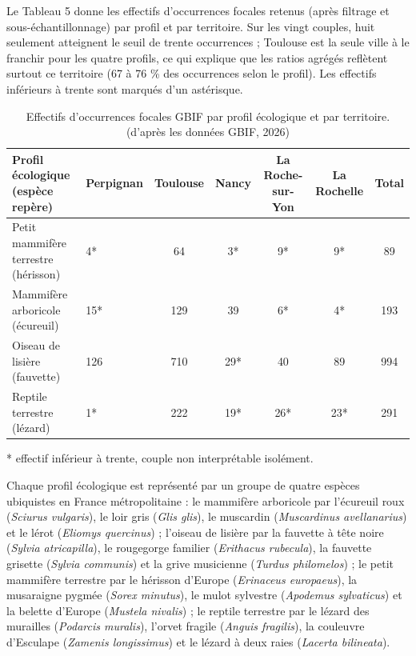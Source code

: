 \documentclass[a4paper,11pt]{report}
\begin{document}
Le Tableau 5 donne les effectifs d'occurrences focales retenus (après filtrage et sous-échantillonnage) par profil et par territoire. Sur les vingt couples, huit seulement atteignent le seuil de trente occurrences ; Toulouse est la seule ville à le franchir pour les quatre profils, ce qui explique que les ratios agrégés reflètent surtout ce territoire (67 à 76 \% des occurrences selon le profil). Les effectifs inférieurs à trente sont marqués d'un astérisque.

\begin{landscape}
\begin{table}[H]
\centering
\footnotesize
\caption{Effectifs d'occurrences focales GBIF par profil écologique et par territoire. (d'après les données GBIF, 2026)}
\begin{tabular}{llccccc}
\toprule
\textbf{Profil écologique (espèce repère)} & \textbf{Perpignan} & \textbf{Toulouse} & \textbf{Nancy} & \textbf{La Roche-sur-Yon} & \textbf{La Rochelle} & \textbf{Total} \\
\midrule
Petit mammifère terrestre (hérisson) & 4* & 64 & 3* & 9* & 9* & 89 \\
Mammifère arboricole (écureuil) & 15* & 129 & 39 & 6* & 4* & 193 \\
Oiseau de lisière (fauvette) & 126 & 710 & 29* & 40 & 89 & 994 \\
Reptile terrestre (lézard) & 1* & 222 & 19* & 26* & 23* & 291 \\
\bottomrule
\end{tabular}
\end{table}
\end{landscape}

* effectif inférieur à trente, couple non interprétable isolément.

Chaque profil écologique est représenté par un groupe de quatre espèces ubiquistes en France métropolitaine : le mammifère arboricole par l'écureuil roux (\textit{Sciurus vulgaris}), le loir gris (\textit{Glis glis}), le muscardin (\textit{Muscardinus avellanarius}) et le lérot (\textit{Eliomys quercinus}) ; l'oiseau de lisière par la fauvette à tête noire (\textit{Sylvia atricapilla}), le rougegorge familier (\textit{Erithacus rubecula}), la fauvette grisette (\textit{Sylvia communis}) et la grive musicienne (\textit{Turdus philomelos}) ; le petit mammifère terrestre par le hérisson d'Europe (\textit{Erinaceus europaeus}), la musaraigne pygmée (\textit{Sorex minutus}), le mulot sylvestre (\textit{Apodemus sylvaticus}) et la belette d'Europe (\textit{Mustela nivalis}) ; le reptile terrestre par le lézard des murailles (\textit{Podarcis muralis}), l'orvet fragile (\textit{Anguis fragilis}), la couleuvre d'Esculape (\textit{Zamenis longissimus}) et le lézard à deux raies (\textit{Lacerta bilineata}).
\end{document}

